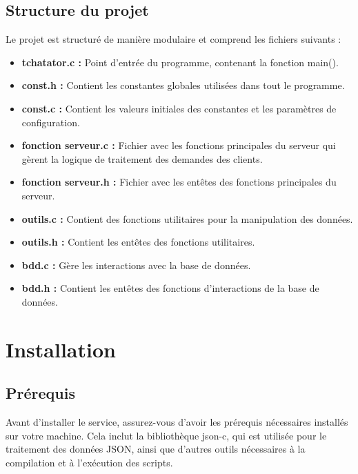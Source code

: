 \documentclass{report}
\begin{document}
\subsection{Structure du projet}

Le projet est structuré de manière modulaire et comprend les fichiers suivants :

\begin{itemize}
	\item \textbf{tchatator.c :} Point d'entrée du programme, contenant la fonction main().
	
	\item \textbf{const.h :} Contient les constantes globales utilisées dans tout le programme.
	
	\item \textbf{const.c :} Contient les valeurs initiales des constantes et les paramètres de configuration.
	
	\item \textbf{fonction serveur.c :} Fichier avec les fonctions principales du serveur qui gèrent la logique de traitement des demandes des clients.
	
	\item \textbf{fonction serveur.h :} Fichier avec les entêtes des fonctions principales du serveur.
	
	\item \textbf{outils.c :} Contient des fonctions utilitaires pour la manipulation des données.
	
	\item \textbf{outils.h :} Contient les entêtes des fonctions utilitaires.
	
	\item \textbf{bdd.c :} Gère les interactions avec la base de données.
	
	\item \textbf{bdd.h :} Contient les entêtes des fonctions d'interactions de la base de données.
	
\end{itemize}

\section{Installation}

\subsection{Prérequis}

Avant d'installer le service, assurez-vous d'avoir les prérequis nécessaires installés sur votre machine. Cela inclut la bibliothèque json-c, qui est utilisée pour le traitement des données JSON, ainsi que d'autres outils nécessaires à la compilation et à l'exécution des scripts. \\
\end{document}
